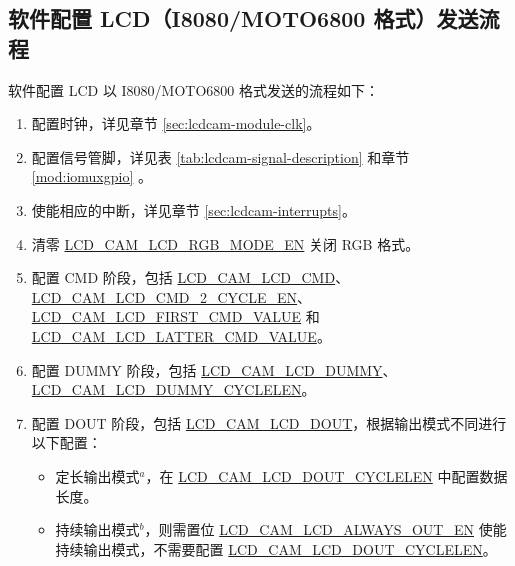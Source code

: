 \documentclass[main\_\_CN.tex]{subfiles}
\begin{document}
\subsection{软件配置 LCD（I8080/MOTO6800 格式）发送流程}

软件配置 LCD 以 I8080/MOTO6800 格式发送的流程如下：

\begin{enumerate}
    \item 配置时钟，详见章节 \ref{sec:lcdcam-module-clk}。
    \item 配置信号管脚，详见表 \ref{tab:lcdcam-signal-description} 和章节 \ref{mod:iomuxgpio} \textit{}。

    \item 使能相应的中断，详见章节 \ref{sec:lcdcam-interrupts}。\label{LCDCAM-TX-INTERRUPT}

    \item 清零 \hyperref[fielddesc:LCDCAMLCDRGBMODEEN]{LCD\_CAM\_LCD\_RGB\_MODE\_EN} 关闭 RGB 格式。
    \item 配置 CMD 阶段，包括 \hyperref[fielddesc:LCDCAMLCDCMD]{LCD\_CAM\_LCD\_CMD}、\hyperref[fielddesc:LCDCAMLCDCMD2CYCLEEN]{LCD\_CAM\_LCD\_CMD\_2\_CYCLE\_EN}、\hyperref[fielddesc:LCDCAMLCDFIRSTCMDVALUE]{LCD\_CAM\_LCD\_FIRST\_CMD\_VALUE} 和 \hyperref[fielddesc:LCDCAMLCDLATTERCMDVALUE]{LCD\_CAM\_LCD\_LATTER\_CMD\_VALUE}。

    \item 配置 DUMMY 阶段，包括 \hyperref[fielddesc:LCDCAMLCDDUMMY]{LCD\_CAM\_LCD\_DUMMY}、\hyperref[fielddesc:LCDCAMLCDDUMMYCYCLELEN]{LCD\_CAM\_LCD\_DUMMY\_CYCLELEN}。
    \item 配置 DOUT 阶段，包括 \hyperref[fielddesc:LCDCAMLCDDOUT]{LCD\_CAM\_LCD\_DOUT}，根据输出模式不同进行以下配置：
\begin{itemize}
    \item 定长输出模式\hyperref[camlcdctrl-note-1]{$^a$}，在 \hyperref[fielddesc:LCDCAMLCDDOUTCYCLELEN]{LCD\_CAM\_LCD\_DOUT\_CYCLELEN} 中配置数据长度。
    \item 持续输出模式\hyperref[camlcdctrl-note-2]{$^b$}，则需置位 \hyperref[fielddesc:LCDCAMLCDALWAYSOUTEN]{LCD\_CAM\_LCD\_ALWAYS\_OUT\_EN} 使能持续输出模式，不需要配置 \hyperref[fielddesc:LCDCAMLCDDOUTCYCLELEN]{LCD\_CAM\_LCD\_DOUT\_CYCLELEN}。


\end{itemize}
\end{enumerate}
\end{document}
